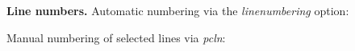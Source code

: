 \textbf{Line numbers.}
Automatic numbering via the \emph{linenumbering} option:

\begin{center}
\end{center}

Manual numbering of selected lines via \emph{pcln}:

\begin{center}
\end{center}
